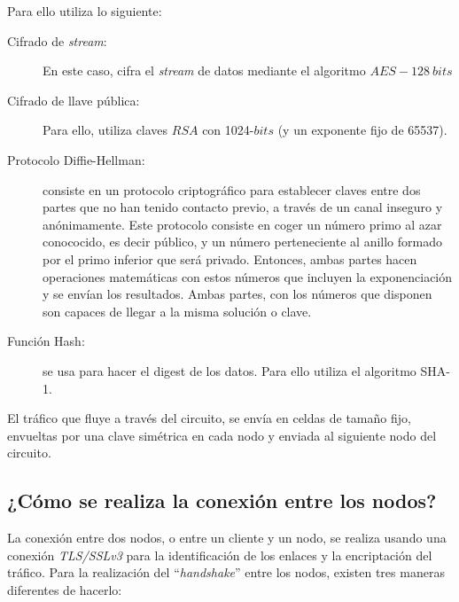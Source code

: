 \documentclass[10pt,a4paper,spanish]{article}
\begin{document}
Para ello utiliza lo siguiente:

\begin{description}
    \item [Cifrado de \textit{stream}:] En este caso, cifra el \textit{stream} de datos mediante el algoritmo $AES-128~bits$
    \item [Cifrado de llave pública:] Para ello, utiliza claves $RSA$ con 1024-$bits$ (y un exponente fijo de 65537).
    \item [Protocolo Diffie-Hellman:] consiste en un protocolo criptográfico para establecer claves entre dos partes que no han tenido contacto previo, a través de un canal inseguro y anónimamente. Este protocolo consiste en coger un número primo al azar conococido, es decir público, y un número perteneciente al anillo formado por el primo inferior que será privado. Entonces, ambas partes hacen operaciones matemáticas con estos números que incluyen la exponenciación y se envían los resultados. Ambas partes, con los números que disponen son capaces de llegar a la misma solución o clave.
    \item [Función Hash:] se usa para hacer el digest de los datos. Para ello utiliza el algoritmo SHA-1.
\end{description}

El tráfico que fluye a través del circuito, se envía en celdas de tamaño fijo, envueltas por una clave simétrica en cada nodo y enviada al siguiente nodo del circuito. 

\subsection{¿Cómo se realiza la conexión entre los nodos?}

La conexión entre dos nodos, o entre un cliente y un nodo, se realiza usando una conexión \textit{TLS/SSLv3} para la identificación de los enlaces y la encriptación del tráfico. Para la realización del ``\textit{handshake}'' entre los nodos, existen tres maneras diferentes de hacerlo:
\end{document}
